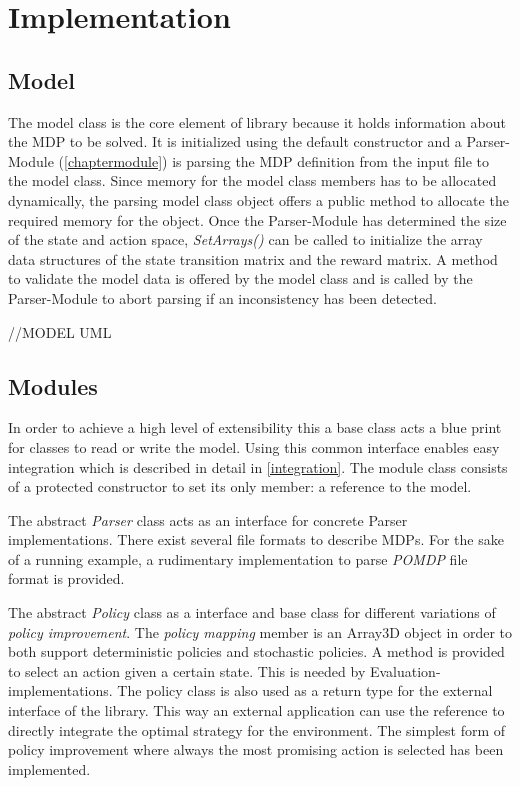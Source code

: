 \chapter{Implementation}

\section{Model}

The model class is the core element of library because it holds information about the MDP to be solved. It is initialized using the default constructor and a Parser-Module (\autoref{chaptermodule}) is parsing the MDP definition from the input file to the model class. Since memory for the model class members has to be allocated dynamically, the parsing model class object offers a public method to allocate the required memory for the object. Once the Parser-Module has determined the size of the state and action space, \emph{SetArrays()} can be called to initialize the array data structures of the state transition matrix and the reward matrix. A method to validate the model data is offered by the model class and is called by the Parser-Module to abort parsing if an inconsistency has been detected. 

//MODEL UML

\section{Modules}
\label{chaptermodule}

In order to achieve a high level of extensibility this a base class acts a blue print for classes to read or write the model. Using this common interface enables easy integration which is described in detail in \autoref{integration}. The module class consists of a protected constructor to set its only member: a reference to the model. 

The abstract \emph{Parser} class acts as an interface for concrete Parser implementations. There exist several file formats to describe MDPs. For the sake of a running example, a rudimentary implementation to parse \emph{POMDP} file format \autocite{Cassandra} is provided. 

The abstract \emph{Policy} class as a interface and base class for different variations of \emph{policy improvement}. The \emph{policy mapping } member is an Array3D object in order to both support deterministic policies and stochastic policies. A method is provided to select an action given a certain state. This is needed by Evaluation-implementations. The policy class is also used as a return type for the external interface of the library. This way an external application can use the reference to directly integrate the optimal strategy for the environment. 
The simplest form of policy improvement where always the most promising action is selected has been implemented. 

